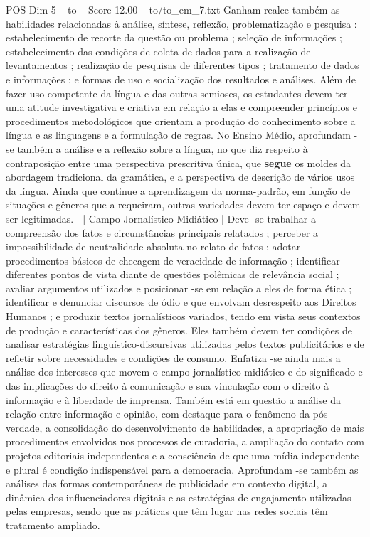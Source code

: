 \begin{textsample}{POS Dim 5 – to – Score 12.00 – to/to\_em\_7.txt}
Ganham realce também as habilidades relacionadas à análise, síntese, reflexão, problematização e pesquisa : estabelecimento de recorte da questão ou problema ; seleção de informações ; estabelecimento das condições de coleta de dados para a realização de levantamentos ; realização de pesquisas de diferentes tipos ; tratamento de dados e informações ; e formas de uso e socialização dos resultados e análises.
Além de fazer uso competente da língua e das outras semioses, os estudantes devem ter uma atitude investigativa e criativa em relação a elas e compreender princípios e procedimentos metodológicos que orientam a produção do conhecimento sobre a língua e as linguagens e a formulação de regras.
No Ensino Médio, aprofundam -se também a análise e a reflexão sobre a língua, no que diz respeito à contraposição entre uma perspectiva prescritiva única, que \textbf{segue} os moldes da abordagem tradicional da gramática, e a perspectiva de descrição de vários usos da língua.
Ainda que continue a aprendizagem da norma-padrão, em função de situações e gêneros que a requeiram, outras variedades devem ter espaço e devem ser legitimadas. | | Campo Jornalístico-Midiático | Deve -se trabalhar a compreensão dos fatos e circunstâncias principais relatados ; perceber a impossibilidade de neutralidade absoluta no relato de fatos ; adotar procedimentos básicos de checagem de veracidade de informação ; identificar diferentes pontos de vista diante de questões polêmicas de relevância social ; avaliar argumentos utilizados e posicionar -se em relação a eles de forma ética ; identificar e denunciar discursos de ódio e que envolvam desrespeito aos Direitos Humanos ; e produzir textos jornalísticos variados, tendo em vista seus contextos de produção e características dos gêneros.
Eles também devem ter condições de analisar estratégias linguístico-discursivas utilizadas pelos textos publicitários e de refletir sobre necessidades e condições de consumo.
Enfatiza -se ainda mais a análise dos interesses que movem o campo jornalístico-midiático e do significado e das implicações do direito à comunicação e sua vinculação com o direito à informação e à liberdade de imprensa.
Também está em questão a análise da relação entre informação e opinião, com destaque para o fenômeno da pós-verdade, a consolidação do desenvolvimento de habilidades, a apropriação de mais procedimentos envolvidos nos processos de curadoria, a ampliação do contato com projetos editoriais independentes e a consciência de que uma mídia independente e plural é condição indispensável para a democracia.
Aprofundam -se também as análises das formas contemporâneas de publicidade em contexto digital, a dinâmica dos influenciadores digitais e as estratégias de engajamento utilizadas pelas empresas, sendo que as práticas que têm lugar nas redes sociais têm tratamento ampliado.

\end{textsample}
